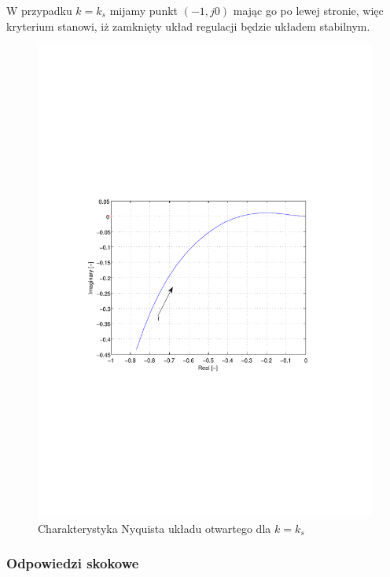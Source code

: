 \documentclass[12pt]{article}
\begin{document}
\newpage

W przypadku $k=k_s$ mijamy punkt $(-1, j0)$ mając go po lewej stronie, więc
kryterium stanowi, iż zamknięty układ regulacji będzie układem stabilnym.

\begin{figure}[!htb]
	\begin{center}
		\includegraphics[trim=5cm 9cm 5cm 9cm]{../res/img/0,1-1-0,5_nyq.pdf} 
	\end{center}
	\caption{Charakterystyka Nyquista układu otwartego dla $k=k_s$}
\end{figure}

\newpage

\subsubsection{Odpowiedzi skokowe}
\end{document}
